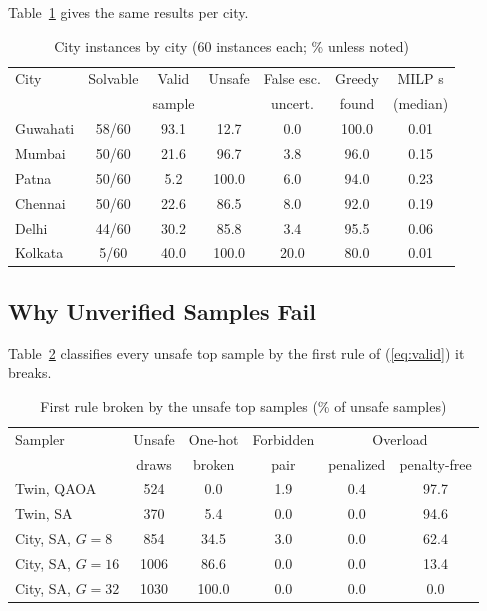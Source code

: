 \documentclass[conference]{IEEEtran}
\begin{document}
Table~\ref{tab:bycity} gives the same results per city. \ByCityText{}

\begin{table}[t]
\caption{City instances by city (60 instances each; \% unless noted)}
\label{tab:bycity}
\centering
\footnotesize
\setlength{\tabcolsep}{2.4pt}
\begin{tabular}{lcccccc}
\toprule
City & Solvable & Valid & Unsafe & False esc. & Greedy & MILP s\\
 & & sample & & uncert. & found & (median)\\
\midrule
Guwahati & 58/60 & 93.1 & 12.7 & 0.0 & 100.0 & 0.01\\
Mumbai & 50/60 & 21.6 & 96.7 & 3.8 & 96.0 & 0.15\\
Patna & 50/60 & 5.2 & 100.0 & 6.0 & 94.0 & 0.23\\
Chennai & 50/60 & 22.6 & 86.5 & 8.0 & 92.0 & 0.19\\
Delhi & 44/60 & 30.2 & 85.8 & 3.4 & 95.5 & 0.06\\
Kolkata & 5/60 & 40.0 & 100.0 & 20.0 & 80.0 & 0.01\\
\bottomrule
\end{tabular}
\end{table}

\subsection{Why Unverified Samples Fail}
\label{sec:viol}
Table~\ref{tab:viol} classifies every unsafe top sample by the first rule of (\ref{eq:valid}) it breaks. \ViolText{}

\begin{table}[t]
\caption{First rule broken by the unsafe top samples (\% of unsafe samples)}
\label{tab:viol}
\centering
\footnotesize
\setlength{\tabcolsep}{2.6pt}
\begin{tabular}{lccccc}
\toprule
Sampler & Unsafe & One-hot & Forbidden & \multicolumn{2}{c}{Overload}\\
 & draws & broken & pair & penalized & penalty-free\\
\midrule
Twin, QAOA & 524 & 0.0 & 1.9 & 0.4 & 97.7\\
Twin, SA & 370 & 5.4 & 0.0 & 0.0 & 94.6\\
City, SA, $G=8$ & 854 & 34.5 & 3.0 & 0.0 & 62.4\\
City, SA, $G=16$ & 1006 & 86.6 & 0.0 & 0.0 & 13.4\\
City, SA, $G=32$ & 1030 & 100.0 & 0.0 & 0.0 & 0.0\\
\bottomrule
\end{tabular}
\end{table}
\end{document}
